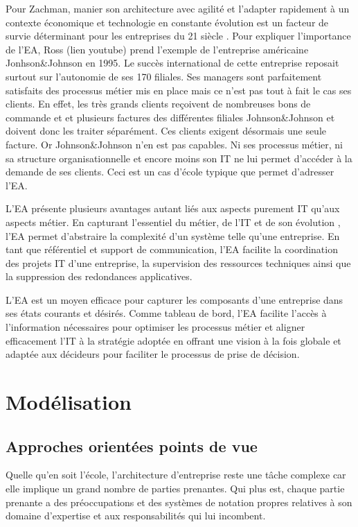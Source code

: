 Pour Zachman, manier son architecture avec agilité et l'adapter rapidement à un contexte économique et technologie en constante évolution est un facteur de survie déterminant pour les entreprises du 21 siècle \cite{zachman1997enterprise}.  Pour expliquer l'importance de l'EA, Ross (lien youtube) prend l'exemple de l'entreprise américaine Jonhson\&Johnson en 1995. Le succès international de cette entreprise reposait surtout sur l'autonomie de ses 170 filiales. Ses managers sont parfaitement satisfaits des processus métier mis en place mais ce n'est pas tout à fait le cas ses clients. En effet, les très grands clients reçoivent de nombreuses bons de commande et et plusieurs factures des différentes filiales Johnson\&Johnson et doivent donc les traiter séparément. Ces clients exigent désormais une seule facture. Or Johnson\&Johnson n'en est pas capables. Ni ses processus métier, ni sa structure organisationnelle et encore moins son IT ne lui permet d'accéder à la demande de ses clients. Ceci est un cas d'école typique que permet d'adresser l'EA.

L'EA présente plusieurs avantages autant liés aux aspects purement IT qu'aux aspects métier. En capturant l'essentiel du métier, de l'IT et de son évolution \cite{lankhorst2013enterprise}, l'EA permet d'abstraire la complexité d'un système telle qu'une entreprise. En tant que référentiel et support de communication, l'EA facilite la coordination des projets IT d'une entreprise, la supervision des ressources techniques ainsi que la suppression des redondances applicatives\cite{shah2007frameworks}.

L'EA est un moyen efficace pour capturer les composants d'une entreprise dans ses états courants et désirés. Comme tableau de bord, l'EA facilite l'accès à l'information nécessaires pour optimiser les processus métier et aligner efficacement l'IT à la stratégie adoptée en offrant une vision à la fois globale et adaptée aux décideurs pour faciliter le processus de prise de décision. 

\section{Modélisation}

	\subsection{Approches orientées points de vue}

Quelle qu'en soit l'école, l'architecture d'entreprise reste une tâche complexe 
\cite{steen2004supporting} car elle implique un grand nombre de parties prenantes. Qui plus est, chaque partie prenante a des préoccupations et des systèmes de notation propres relatives à son domaine d'expertise et aux responsabilités qui lui incombent.

